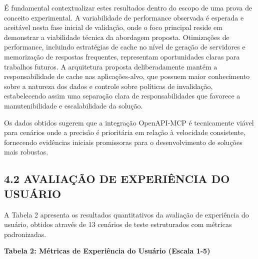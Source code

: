 \documentclass[
]{article}
\begin{document}
É fundamental contextualizar estes resultados dentro do escopo de uma
prova de conceito experimental. A variabilidade de performance observada
é esperada e aceitável nesta fase inicial de validação, onde o foco
principal reside em demonstrar a viabilidade técnica da abordagem
proposta. Otimizações de performance, incluindo estratégias de cache no
nível de geração de servidores e memorização de respostas frequentes,
representam oportunidades claras para trabalhos futuros. A arquitetura
proposta deliberadamente mantém a responsabilidade de cache nas
aplicações-alvo, que possuem maior conhecimento sobre a natureza dos
dados e controle sobre políticas de invalidação, estabelecendo assim uma
separação clara de responsabilidades que favorece a manutenibilidade e
escalabilidade da solução.

Os dados obtidos sugerem que a integração OpenAPI-MCP é tecnicamente
viável para cenários onde a precisão é prioritária em relação à
velocidade consistente, fornecendo evidências iniciais promissoras para
o desenvolvimento de soluções mais robustas.

\subsection{4.2 AVALIAÇÃO DE EXPERIÊNCIA DO
USUÁRIO}\label{avaliauxe7uxe3o-de-experiuxeancia-do-usuuxe1rio}

A Tabela 2 apresenta os resultados quantitativos da avaliação de
experiência do usuário, obtidos através de 13 cenários de teste
estruturados com métricas padronizadas.

\textbf{Tabela 2: Métricas de Experiência do Usuário (Escala 1-5)}
\end{document}
